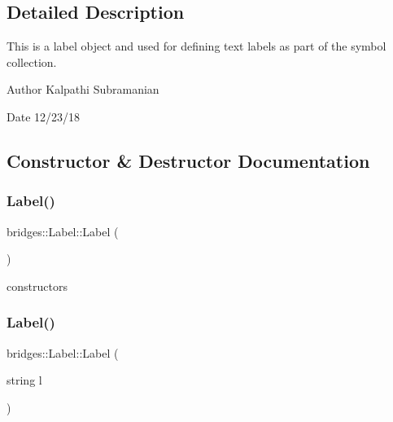 \subsection{Detailed Description}
This is a label object and used for defining text labels as part of the symbol collection. 

\begin{DoxyAuthor}{Author}
Kalpathi Subramanian 
\end{DoxyAuthor}
\begin{DoxyDate}{Date}
12/23/18 
\end{DoxyDate}


\subsection{Constructor \& Destructor Documentation}
\mbox{\label{classbridges_1_1_label_a6ecba5526127d5ed4d37bb38da560cc8}} 
\subsubsection{\texorpdfstring{Label()}{Label()}\hspace{0.1cm}{\footnotesize\ttfamily [1/2]}}
{\footnotesize\ttfamily bridges\+::\+Label\+::\+Label (\begin{DoxyParamCaption}{ }\end{DoxyParamCaption})\hspace{0.3cm}{\ttfamily [inline]}}

constructors \mbox{\label{classbridges_1_1_label_a339ddf0650b3e2aa7383ab58cb61e8fa}} 
\subsubsection{\texorpdfstring{Label()}{Label()}\hspace{0.1cm}{\footnotesize\ttfamily [2/2]}}
{\footnotesize\ttfamily bridges\+::\+Label\+::\+Label (\begin{DoxyParamCaption}\item[{string}]{l }\end{DoxyParamCaption})\hspace{0.3cm}{\ttfamily [inline]}}



